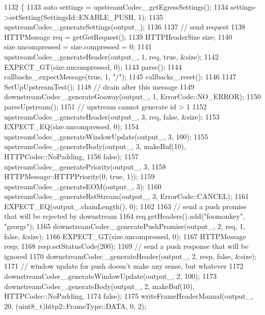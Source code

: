 \begin{DoxyCode}
1132                                        \{
1133   \textcolor{keyword}{auto} settings = upstreamCodec\_.getEgressSettings();
1134   settings->setSetting(SettingsId::ENABLE\_PUSH, 1);
1135   upstreamCodec\_.generateSettings(output\_);
1136 
1137   \textcolor{comment}{// send request}
1138   HTTPMessage req = getGetRequest();
1139   HTTPHeaderSize size;
1140   size.uncompressed = size.compressed = 0;
1141   upstreamCodec\_.generateHeader(output\_, 1, req, \textcolor{keyword}{true}, &size);
1142   EXPECT\_GT(size.uncompressed, 0);
1143   parse();
1144   callbacks\_.expectMessage(\textcolor{keyword}{true}, 1, \textcolor{stringliteral}{"/"});
1145   callbacks\_.reset();
1146 
1147   SetUpUpstreamTest();
1148   \textcolor{comment}{// drain after this message}
1149   downstreamCodec\_.generateGoaway(output\_, 1, ErrorCode::NO\_ERROR);
1150   parseUpstream();
1151   \textcolor{comment}{// upstream cannot generate id > 1}
1152   upstreamCodec\_.generateHeader(output\_, 3, req, \textcolor{keyword}{false}, &size);
1153   EXPECT\_EQ(size.uncompressed, 0);
1154   upstreamCodec\_.generateWindowUpdate(output\_, 3, 100);
1155   upstreamCodec\_.generateBody(output\_, 3, makeBuf(10), HTTPCodec::NoPadding,
1156                               \textcolor{keyword}{false});
1157   upstreamCodec\_.generatePriority(output\_, 3,
1158                                   HTTPMessage::HTTPPriority(0, \textcolor{keyword}{true}, 1));
1159   upstreamCodec\_.generateEOM(output\_, 3);
1160   upstreamCodec\_.generateRstStream(output\_, 3, ErrorCode::CANCEL);
1161   EXPECT\_EQ(output\_.chainLength(), 0);
1162 
1163   \textcolor{comment}{// send a push promise that will be rejected by downstream}
1164   req.getHeaders().add(\textcolor{stringliteral}{"foomonkey"}, \textcolor{stringliteral}{"george"});
1165   downstreamCodec\_.generatePushPromise(output\_, 2, req, 1, \textcolor{keyword}{false}, &size);
1166   EXPECT\_GT(size.uncompressed, 0);
1167   HTTPMessage resp;
1168   resp.setStatusCode(200);
1169   \textcolor{comment}{// send a push response that will be ignored}
1170   downstreamCodec\_.generateHeader(output\_, 2, resp, \textcolor{keyword}{false}, &size);
1171   \textcolor{comment}{// window update for push doesn't make any sense, but whatever}
1172   downstreamCodec\_.generateWindowUpdate(output\_, 2, 100);
1173   downstreamCodec\_.generateBody(output\_, 2, makeBuf(10), HTTPCodec::NoPadding,
1174                                 \textcolor{keyword}{false});
1175   writeFrameHeaderManual(output\_, 20, (uint8\_t)http2::FrameType::DATA, 0, 2);

\end{DoxyCode}
